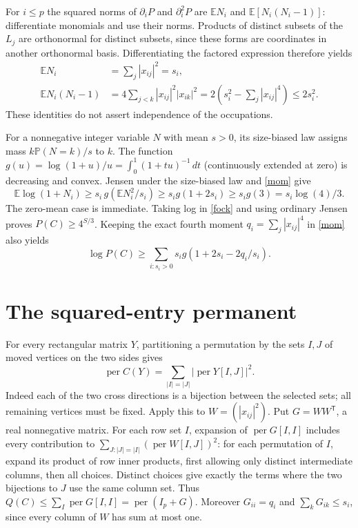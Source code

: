 \documentclass[11pt]{article}
\newcommand{\per}{\operatorname{per}}
\newcommand{\E}{\mathbb E}
\begin{document}
For $i\le p$ the squared norms of $\partial_i P$ and $\partial_i^2 P$
are $\E N_i$ and $\E[N_i(N_i-1)]$: differentiate monomials and use
their norms. Products of distinct subsets of the $L_j$ are orthonormal
for distinct subsets, since these forms are coordinates in another
orthonormal basis. Differentiating the factored expression therefore yields
\begin{align}
 \E N_i&=\sum_j|x_{ij}|^2=s_i,\nonumber\\
 \E N_i(N_i-1)&=4\sum_{j<k}|x_{ij}|^2 |x_{ik}|^2
              =2\left(s_i^2-\sum_j|x_{ij}|^4\right)\le2s_i^2.
 \label{mom}
\end{align}
These identities do not assert independence of the occupations.

For a nonnegative integer variable $N$ with mean $s>0$, its size-biased
law assigns mass $k\mathbb P(N=k)/s$ to $k$. The function
$g(u)=\log(1+u)/u=\int_0^1(1+tu)^{-1}\,dt$ (continuously extended
at zero) is decreasing and convex. Jensen under the size-biased law
and \eqref{mom} give
\[
 \E\log(1+N_i)\ge s_i\,g(\E N_i^2/s_i)
 \ge s_i g(1+2s_i)\ge s_i g(3)=s_i\log(4)/3 .
\]
The zero-mean case is immediate. Taking log in \eqref{fock} and using
ordinary Jensen proves $P(C)\ge4^{S/3}$. Keeping the exact fourth
moment $q_i=\sum_j|x_{ij}|^4$ in \eqref{mom} also yields
\begin{equation}\label{lb}
 \log P(C)\ge\sum_{i:s_i>0} s_i g(1+2s_i-2q_i/s_i).
\end{equation}

\section{The squared-entry permanent}
For every rectangular matrix $Y$, partitioning a permutation by the
sets $I,J$ of moved vertices on the two sides gives
\[
 \per C(Y)=\sum_{|I|=|J|}|\per Y[I,J]|^2 .
\]
Indeed each of the two cross directions is a bijection between the
selected sets; all remaining vertices must be fixed.
Apply this to $W=(|x_{ij}|^2)$. Put $G=WW^{\mathsf T}$, a real
nonnegative matrix. For each row set $I$, expansion of
$\per G[I,I]$ includes every contribution to
$\sum_{J:|J|=|I|}(\per W[I,J])^2$: for each permutation of $I$,
expand its product of row inner products, first allowing only distinct
intermediate columns, then all choices. Distinct choices give exactly
the terms where the two bijections to $J$ use the same column set.
Thus $Q(C)\le\sum_I\per G[I,I]=\per(I_p+G)$.
Moreover $G_{ii}=q_i$ and $\sum_k G_{ik}\le s_i$, since every
column of $W$ has sum at most one.
\end{document}
